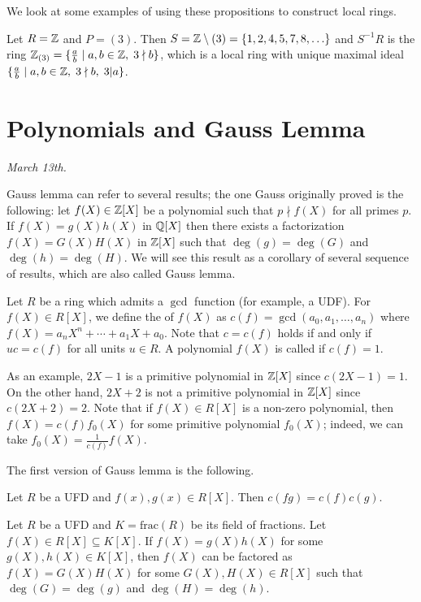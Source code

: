 We look at some examples of using these propositions to construct local rings.

\begin{example}
    Let $R = \mathbb{Z}$ and $P = (3)$. Then $S = \mathbb{Z} \setminus (3) = \{1,2,4,5,7,8,\ldots\}$ and $S^{-1}R$ is the ring $\mathbb{Z}_{(3)} = \{\frac{a}{b} \mid a,b \in \mathbb{Z}, \; 3 \nmid b\}$, which is a local ring with unique maximal ideal $\{\frac{a}{b} \mid a,b \in \mathbb{Z}, \; 3 \nmid b, \; 3 | a\}$.
\end{example}

\section{Polynomials and Gauss Lemma}
\textit{March 13th.}

Gauss lemma can refer to several results; the one Gauss originally proved is the following: let $f(X) \in \mathbb{Z}[X]$ be a polynomial such that $p \nmid f(X)$ for all primes $p$. If $f(X) = g(X) h(X)$ in $\mathbb{Q}[X]$ then there exists a factorization $f(X) = G(X) H(X)$ in $\mathbb{Z}[X]$ such that $\deg(g) = \deg(G)$ and $\deg(h) = \deg(H)$. We will see this result as a corollary of several sequence of results, which are also called Gauss lemma.

\begin{definition}
    Let $R$ be a ring which admits a $\gcd$ function (for example, a UDF). For $f(X) \in R[X]$, we define the  of $f(X)$ as $c(f) = \gcd(a_{0},a_{1},\ldots,a_{n})$ where $f(X) = a_{n}X^{n} + \cdots + a_{1}X + a_{0}$. Note that $c = c(f)$ holds if and only if $uc = c(f)$ for all units $u \in R$. A polynomial $f(X)$ is called  if $c(f) = 1$.
\end{definition}

As an example, $2X-1$ is a primitive polynomial in $\mathbb{Z}[X]$ since $c(2X-1) = 1$. On the other hand, $2X+2$ is not a primitive polynomial in $\mathbb{Z}[X]$ since $c(2X+2) = 2$. Note that if $f(X) \in R[X]$ is a non-zero polynomial, then $f(X) = c(f) f_{0}(X)$ for some primitive polynomial $f_{0}(X)$; indeed, we can take $f_{0}(X) = \frac{1}{c(f)} f(X)$.

The first version of Gauss lemma is the following.
\begin{lemma}
    Let $R$ be a UFD and $f(x),g(x) \in R[X]$. Then $c(fg) = c(f) c(g)$.
\end{lemma}
\begin{lemma}
    Let $R$ be a UFD and $K = \mathrm{frac}(R)$ be its field of fractions. Let $f(X) \in R[X] \subseteq K[X]$. If $f(X) = g(X) h(X)$ for some $g(X),h(X) \in K[X]$, then $f(X)$ can be factored as $f(X) = G(X) H(X)$ for some $G(X),H(X) \in R[X]$ such that $\deg(G) = \deg(g)$ and $\deg(H) = \deg(h)$.
\end{lemma}

